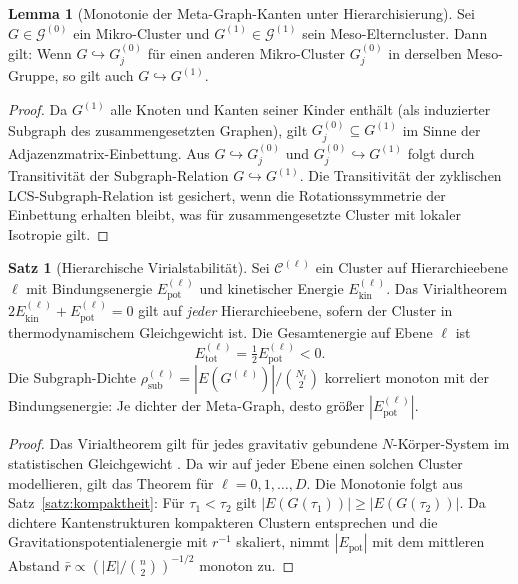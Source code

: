 ﻿\documentclass[a4paper,12pt]{report}
\theoremstyle{definition}
\newtheorem{satz}{Satz}
\newtheorem{lemma}{Lemma}
\begin{document}
\begin{lemma}[Monotonie der Meta-Graph-Kanten unter Hierarchisierung]
\label{lem:monotonie_meta}
Sei $G \in \mathcal{G}^{(0)}$ ein Mikro-Cluster und $G^{(1)} \in \mathcal{G}^{(1)}$ sein Meso-Elterncluster. Dann gilt: Wenn $G \hookrightarrow G^{(0)}_j$ für einen anderen Mikro-Cluster $G^{(0)}_j$ in derselben Meso-Gruppe, so gilt auch $G \hookrightarrow G^{(1)}$.
\end{lemma}

\begin{proof}
Da $G^{(1)}$ alle Knoten und Kanten seiner Kinder enthält (als induzierter Subgraph des zusammengesetzten Graphen), gilt $G^{(0)}_j \subseteq G^{(1)}$ im Sinne der Adjazenzmatrix-Einbettung. Aus $G \hookrightarrow G^{(0)}_j$ und $G^{(0)}_j \hookrightarrow G^{(1)}$ folgt durch Transitivität der Subgraph-Relation $G \hookrightarrow G^{(1)}$. Die Transitivität der zyklischen LCS-Subgraph-Relation ist gesichert, wenn die Rotationssymmetrie der Einbettung erhalten bleibt, was für zusammengesetzte Cluster mit lokaler Isotropie gilt.
\end{proof}

\begin{satz}[Hierarchische Virialstabilität]
\label{satz:hier_virial}
Sei $\mathcal{C}^{(\ell)}$ ein Cluster auf Hierarchieebene $\ell$ mit Bindungsenergie $E^{(\ell)}_\mathrm{pot}$ und kinetischer Energie $E^{(\ell)}_\mathrm{kin}$. Das Virialtheorem $2E^{(\ell)}_\mathrm{kin} + E^{(\ell)}_\mathrm{pot} = 0$ gilt auf \emph{jeder} Hierarchieebene, sofern der Cluster in thermodynamischem Gleichgewicht ist. Die Gesamtenergie auf Ebene $\ell$ ist
\[
E^{(\ell)}_\mathrm{tot} = \tfrac{1}{2} E^{(\ell)}_\mathrm{pot} < 0.
\]
Die Subgraph-Dichte $\rho^{(\ell)}_\mathrm{sub} = |E(G^{(\ell)})| / \binom{N_\ell}{2}$ korreliert monoton mit der Bindungsenergie: Je dichter der Meta-Graph, desto größer $|E^{(\ell)}_\mathrm{pot}|$.
\end{satz}

\begin{proof}
Das Virialtheorem gilt für jedes gravitativ gebundene $N$-Körper-System im statistischen Gleichgewicht \cite{spitzer1987}. Da wir auf jeder Ebene einen solchen Cluster modellieren, gilt das Theorem für $\ell = 0, 1, \ldots, D$. Die Monotonie folgt aus Satz~\ref{satz:kompaktheit}: Für $\tau_1 < \tau_2$ gilt $|E(G(\tau_1))| \geq |E(G(\tau_2))|$. Da dichtere Kantenstrukturen kompakteren Clustern entsprechen und die Gravitationspotentialenergie mit $r^{-1}$ skaliert, nimmt $|E_\mathrm{pot}|$ mit dem mittleren Abstand $\bar{r} \propto (|E|/\binom{n}{2})^{-1/2}$ monoton zu.
\end{proof}
\end{document}
